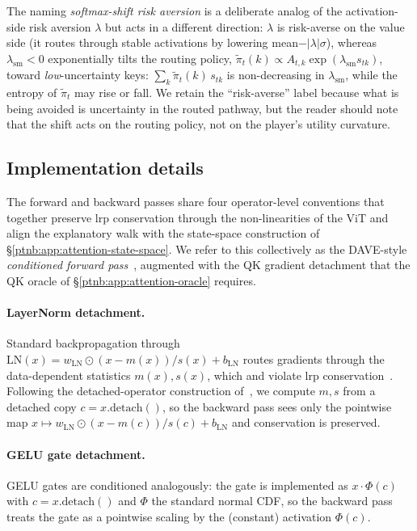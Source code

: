 The naming \emph{softmax-shift risk aversion} is a deliberate analog of the activation-side risk
aversion $\lambda$ but acts in a different direction: $\lambda$ is risk-averse on the value side
(it routes through stable activations by lowering mean$-|\lambda|\sigma$), whereas
$\lambda_{\mathrm{sm}}<0$ exponentially tilts the routing policy, $\tilde\pi_t(k) \propto
    A_{t,k}\exp(\lambda_{\mathrm{sm}} s_{tk})$, toward \emph{low}-uncertainty keys: $\sum_k
    \tilde\pi_t(k)\, s_{tk}$ is non-decreasing in $\lambda_{\mathrm{sm}}$, while the entropy of
$\tilde\pi_t$ may rise or fall. We retain the ``risk-averse'' label because what is being avoided
is uncertainty in the routed pathway, but the reader should note that the shift acts on the routing
policy, not on the player's utility curvature.

\subsection{Implementation details}\label{ptnb:app:vit-implementation}\label{sec:vit_implementation}

The forward and backward passes  share four operator-level conventions
that together preserve \ac{lrp} conservation through the non-linearities of the ViT and align the
explanatory walk with the state-space construction of \S\ref{ptnb:app:attention-state-space}. We refer to this collectively as
the DAVE-style \emph{conditioned forward pass}~\parencite{Wrobel2024}, augmented with the QK gradient
detachment that the QK oracle of \S\ref{ptnb:app:attention-oracle} requires.

\paragraph{LayerNorm detachment.}\label{ptnb:app:dave-conditioned}
Standard backpropagation through $\text{LN}(x) = w_{\mathrm{LN}} \odot (x - m(x))/s(x) +
    b_{\mathrm{LN}}$ routes gradients through the data-dependent statistics $m(x), s(x)$, which  and
violate \ac{lrp} conservation~\parencite{Ali2022AttnLRP}. Following the detached-operator
construction of~\textcite{Wrobel2024}, we compute $m, s$ from a detached copy $c = x.\text{detach}()$,
so the backward pass sees only the pointwise map $x \mapsto w_{\mathrm{LN}} \odot (x - m(c))/s(c) +
    b_{\mathrm{LN}}$ and conservation is preserved.

\paragraph{GELU gate detachment.}
GELU gates are conditioned analogously: the gate is implemented as $x \cdot \Phi(c)$ with $c =
    x.\text{detach}()$ and $\Phi$ the standard normal CDF, so the backward pass treats the gate as a
pointwise scaling by the (constant) activation $\Phi(c)$.

